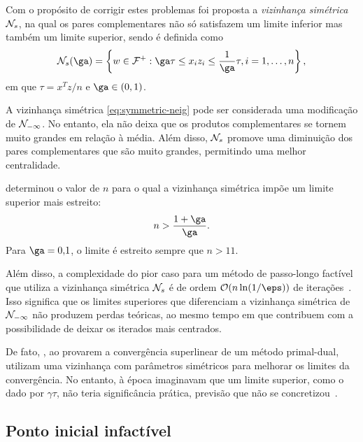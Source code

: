 Com o propósito de corrigir estes problemas foi proposta a \emph{vizinhança
simétrica} $\mathcal{N}_s$, na qual os pares complementares não só satisfazem um limite inferior
mas também um limite superior, sendo é definida como
\begin{equation}
\label{eq:symmetric-neig}
\Nset_s(\ga) = \left\{w\in\Fset^+ : \ga\tau \leq x_iz_i \leq
\frac{1}{\ga}\tau, i=1,\dotsc,n \right\},
\end{equation}
em que $\tau = x^Tz/n$ e $\ga\in(0,1)$.

A vizinhança simétrica \eqref{eq:symmetric-neig}  pode ser considerada uma
modificação de $\mathcal{N}_{-\infty}$. No entanto, ela não deixa que os
produtos complementares se tornem muito grandes em relação à média. Além disso, $\mathcal{N}_s$ promove uma diminuição dos
pares complementares que são muito grandes, permitindo uma melhor centralidade. 


\textcite{Colombo:2008wm}
determinou o valor de $n$ para o qual a vizinhança simétrica impõe um limite
superior mais estreito:
\[
n> \frac{1+\ga}{\ga}.
\]
Para  $\ga=\num{0.1}$, o limite é estreito sempre que $n>11$. 

Além disso, a complexidade do pior caso  para um método de passo-longo factível
que utiliza a vizinhança simétrica $\mathcal{N}_s$ é de ordem $\Oset(n\ln(1/\eps))$ de iterações~\cite{Colombo:2008ia}.
Isso significa que  os limites superiores que diferenciam a vizinhança simétrica
de $\mathcal{N}_{-\infty}$ não produzem perdas teóricas, ao mesmo tempo em que
contribuem com  a possibilidade de deixar os iterados mais centrados.
  
  
De fato, \textcite{Zhang:1993gn}, ao provarem a convergência superlinear de um método
primal-dual, utilizam uma vizinhança com parâmetros simétricos para melhorar os
limites da convergência. No entanto, à época imaginavam que um limite superior,
como o dado por $\gamma\tau$,  não teria significância prática, previsão  que não se
concretizou~\cite{Gondzio:1996uw,Colombo:2008wm,Colombo:2008ia}.

\subsection{Ponto inicial infactível}
\label{sec:infeasible_inicial_point}

